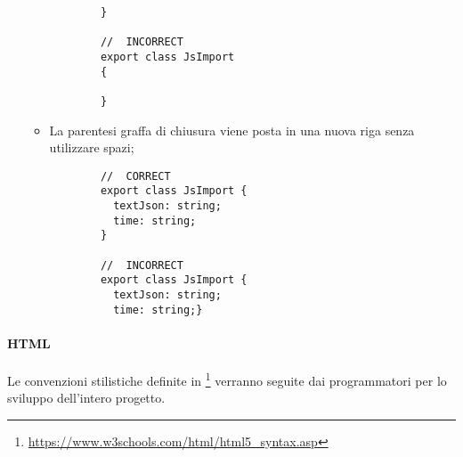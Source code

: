 \begin{itemize}
\begin{itemize}
\begin{lstlisting}
		}
		
		//  INCORRECT
		export class JsImport 
		{  
		
		}
		\end{lstlisting} 
		
		\item{La parentesi graffa di chiusura viene posta in una nuova riga senza utilizzare spazi;}
		\begin{lstlisting}
		//  CORRECT
		export class JsImport {  
		  textJson: string;
		  time: string;
		}
		
		//  INCORRECT
		export class JsImport {  
		  textJson: string;
		  time: string;}
		\end{lstlisting}
		\end{itemize}	
\end{itemize}

\paragraph{HTML}\Spazio
Le convenzioni stilistiche definite in \footnote{\url{https://www.w3schools.com/html/html5_syntax.asp}} verranno seguite dai programmatori per lo sviluppo dell'intero progetto.

